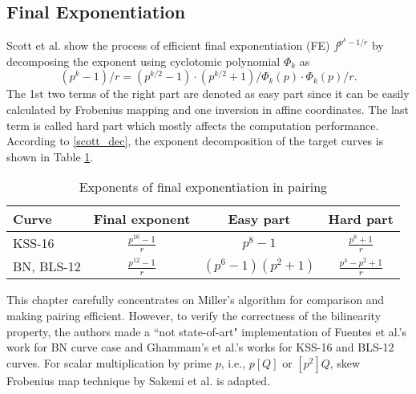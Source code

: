 \subsection{Final Exponentiation}
Scott et al. \cite{PAIRING:SBCDK09a} show the process of efficient final exponentiation (FE) $f^{p^k-1/r}$ by decomposing the exponent using cyclotomic polynomial $\Phi_{k}$ as 
\begin{equation}\label{scott_dec}
(p^k-1)/r = (p^{k/2}-1) \cdot(p^{k/2}+1)/\Phi_{k}(p)\cdot \Phi_{k}(p)/r.
\end{equation}
The 1st two terms of the right part are denoted as easy part since it can be easily calculated by Frobenius mapping and one inversion in affine coordinates. 
The last term is called hard part which mostly affects the computation performance.
According to \eqref{scott_dec}, the exponent decomposition of the target curves is shown in Table \ref{fe_decomp}.
\renewcommand{\baselinestretch}{1.5}
\begin{table}[htb]
\centering
\caption{Exponents of final exponentiation in pairing}
\label{fe_decomp}
\begin{tabular}{l|c|c|c}
\hline
Curve      & \quad Final exponent                \quad  & \quad Easy part    \quad                   &   \quad Hard part     \quad                                        \\ \hline
KSS-16     & \quad $\frac{p^{16}-1}{r}$ \quad & \quad $p^8-1$                           \quad     & \quad $\frac{p^8+1}{r}$      \quad                                         \\ \hline
BN, BLS-12 \quad \quad &  \quad $\frac{p^{12}-1}{r}$ \quad & \quad $(p^6-1)(p^2+1)$ \quad & \quad $\frac{p^4-p^2+1}{r}$  \quad\\
\hline
\end{tabular}
\end{table}
\renewcommand{\baselinestretch}{1.0}

This chapter carefully concentrates on Miller's algorithm for comparison and making pairing efficient. However, to verify the correctness of the bilinearity property,  the authors made a ``not state-of-art" implementation of  Fuentes et al.'s work \cite{SAC:FueKnaRod11} for  BN curve case and  Ghammam's et al.'s works \cite{EPRINT:GhaFou16b,EPRINT:GhaFou16a} for KSS-16 and BLS-12 curves.
For scalar multiplication by prime $p$, i.e., $p[Q]$ or $[p^2]Q$, skew Frobenius map technique by Sakemi et al. \cite{CANS:SNOKM08} is adapted.



